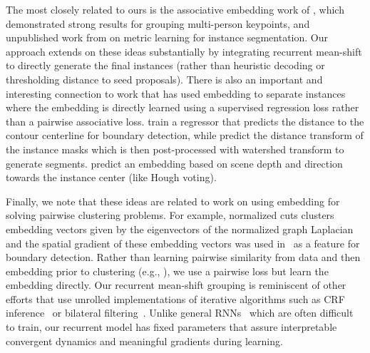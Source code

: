 The most closely related to ours is the associative embedding work of
\cite{newell2016associative}, which demonstrated strong results for grouping
multi-person keypoints, and unpublished work from \cite{fathi2017semantic} on
metric learning for instance segmentation.  Our approach extends on these ideas
substantially by integrating recurrent mean-shift to directly generate the
final instances (rather than heuristic decoding or thresholding distance to
seed proposals). There is also an important and interesting connection to work
that has used embedding to separate instances where the embedding is directly
learned using a supervised regression loss rather than a pairwise associative
loss.  \cite{sironi2014multiscale} train a regressor that predicts the distance
to the contour centerline for boundary detection, while \cite{bai2016deep}
predict the distance transform of the instance masks which is then
post-processed with watershed transform to generate segments.
\cite{uhrig2016pixel} predict an embedding based on scene depth and direction
towards the instance center (like Hough voting).

Finally, we note that these ideas are related to work on using embedding for
solving pairwise clustering problems. For example, normalized cuts clusters
embedding vectors given by the eigenvectors of the normalized graph
Laplacian~\cite{shi2000normalized} and the spatial gradient of these embedding
vectors was used in~\cite{arbelaez2011contour} as a feature for boundary
detection. Rather than learning pairwise similarity from data and then
embedding prior to clustering (e.g., \cite{maire2016affinity}), we use a
pairwise loss but learn the embedding directly. Our recurrent mean-shift
grouping is reminiscent of other efforts that use unrolled implementations of
iterative algorithms such as CRF inference~\cite{zheng2015conditional} or
bilateral filtering~\cite{jampani2016learning, gadde2015superpixel}. Unlike
general RNNs~\cite{bengio1994learning, pascanu2013difficulty} which are often
difficult to train, our recurrent model has fixed parameters that assure
interpretable convergent dynamics and meaningful gradients during learning.


